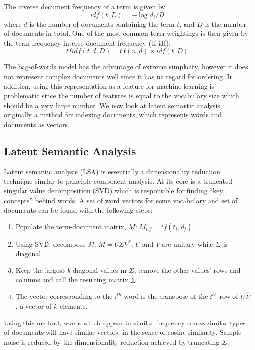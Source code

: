 The inverse document frequency of a term is given by
\begin{equation}
idf(t,D) = -\log d_t/D
\end{equation}
where $d$ is the number of documents containing the term $t$, and $D$ is the number of documents in total.  One of the most common term weightings is then given by the term frequency-inverse document frequency (tf-idf):
\begin{equation}
tfidf(t,d,D) = tf(n,d) \times idf(t,D)
\end{equation}

The bag-of-words model has the advantage of extreme simplicity, however it does not represent complex documents well since it has no regard for ordering.  In addition, using this representation as a feature for machine learning is problematic since the number of features is equal to the vocabulary size which should be a very large number.  We now look at latent semantic analysis, originally a method for indexing documents, which represents words and documents as vectors.

\subsection{Latent Semantic Analysis}
Latent semantic analysis (LSA) is essentially a dimensionality reduction technique similar to principle component analysis.  At its core is a truncated singular value decomposition (SVD) which is responsible for finding ``key concepts'' behind words.  A set of word vectors for some vocabulary and set of documents can be found with the following steps:

\begin{enumerate}
\item Populate the term-document matrix, $M$: $M_{i,j} = tf(t_i,d_j)$
\item Using SVD, decompose $M$: $M = U\Sigma V^*$.  $U$ and $V$ are unitary while $\Sigma$ is diagonal.
\item Keep the largest $k$ diagonal values in $\Sigma$, remove the other values' rows and columns and call the resulting matrix $\hat{\Sigma}$.
\item The vector corresponding to the $i^{th}$ word is the transpose of the $i^{th}$ row of $U\hat{\Sigma}$, a vector of $k$ elements.
\end{enumerate}
\noindent
Using this method, words which appear in similar frequency across similar types of documents will have similar vectors, in the sense of cosine similarity.  Sample noise is reduced by the dimensionality reduction achieved by truncating $\Sigma$.

